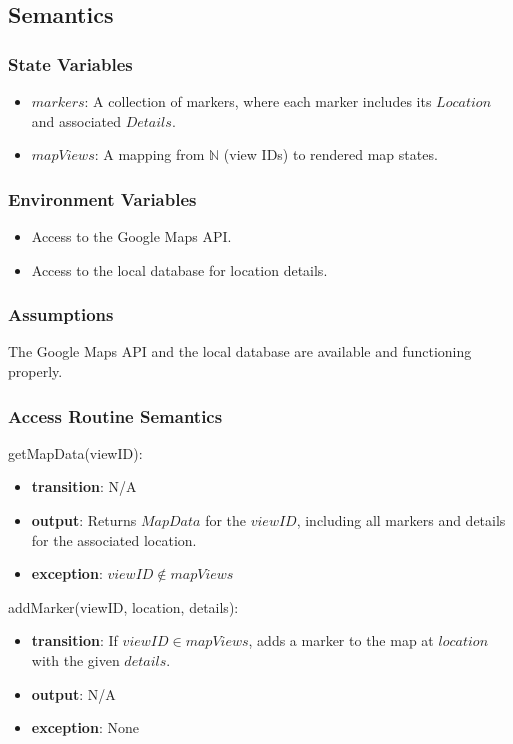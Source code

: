 \documentclass[12pt, titlepage]{article}
\begin{document}
\subsection{Semantics}

\subsubsection{State Variables}

\begin{itemize}
  \item \( markers \): A collection of markers, where each marker includes its \( Location \) and associated \( Details \).
  \item \( mapViews \): A mapping from \( \mathbb{N} \) (view IDs) to rendered map states.
\end{itemize}

\subsubsection{Environment Variables}

\begin{itemize}
  \item Access to the Google Maps API.
  \item Access to the local database for location details.
\end{itemize}

\subsubsection{Assumptions}

The Google Maps API and the local database are available and functioning properly.

\subsubsection{Access Routine Semantics}

\noindent getMapData(viewID):
\begin{itemize}
  \item \textbf{transition}: N/A
  \item \textbf{output}: Returns \( MapData \) for the \( viewID \), including all markers and details for the associated location.
  \item \textbf{exception}: \( viewID \notin mapViews \)
\end{itemize}

\noindent addMarker(viewID, location, details):
\begin{itemize}
  \item \textbf{transition}:
        If \( viewID \in mapViews \), adds a marker to the map at \( location \) with the given \( details \).
  \item \textbf{output}: N/A
  \item \textbf{exception}: None
\end{itemize}
\end{document}
